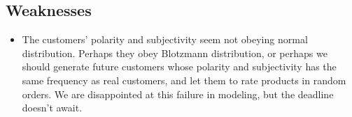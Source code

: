 \documentclass[12pt]{article}  %
\begin{document}
\subsection{Weaknesses}
\begin{itemize}
    \item The customers' polarity and subjectivity seem not obeying normal distribution. Perhaps they obey Blotzmann distribution, or perhaps we should generate future customers whose polarity and subjectivity has the same frequency as real customers, and let them to rate products in random orders. We are disappointed at this failure in modeling, but the deadline doesn't await.
 \end{itemize}


\end{document}

